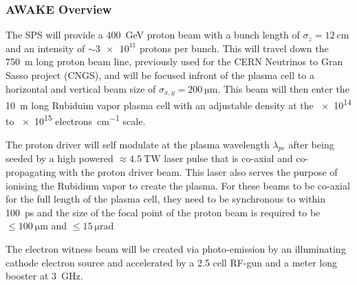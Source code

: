 \subsubsection{AWAKE Overview}

The SPS will provide a \SI{400}{\giga\electronvolt} proton beam with a bunch
length of \(\sigma_z = \SI{12}{\centi\meter}\) and an intensity of \(\sim
\num{3e11}\) protons per bunch. This will travel down the \SI{750}{\meter} long
proton beam line, previously used for the CERN Neutrinos to Gran Sasso project
(CNGS), and will be focused infront of the plasma cell to a horizontal and
vertical beam size of \(\sigma_{x,y} = \SI{200}{\micro\meter}\). This beam will
then enter the \SI{10}{\meter} long Rubiduim vapor plasma cell with an
adjustable density at the \num{e14} to \num{e15} \si{electrons\per\centi\meter}
scale.

The proton driver will self modulate at the plasma wavelength \(\lambda_{pe}\)
after being seeded by a high powered \(\approx \SI{4.5}{\tera\watt}\) laser
pulse that is co-axial and co-propagating with the proton driver beam. This
laser also serves the purpose of ionising the Rubidium vapor to create the
plasma. For these beams to be co-axial for the full length of the plasma cell,
they need to be synchronous to within \SI{100}{\pico\second} and the size of the
focal point of the proton beam is required to be \(\le\SI{100}{\micro\meter}\)
and \(\le\SI{15}{\micro\radian}\)

The electron witness beam will be created via photo-emission by an illuminating
cathode electron source and accelerated by a 2.5 cell RF-gun and a meter long
booster at \SI{3}{\giga\hertz}.






